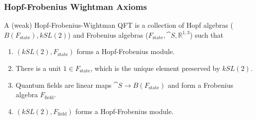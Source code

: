 \documentclass{beamer}
\begin{document}
\begin{frame}
\frametitle{Hopf-Frobenius Wightman Axioms}




A (weak) Hopf-Frobenius-Wightman QFT is a collection of Hopf algebras ($B(F_{\text{state}}), k SL(2)$)  and Frobenius algebras ($F_{\text{state}}, \cat{S}, \mathbb{R}^{1,3}$)  such that

\bigskip

\begin{enumerate}


\item {} $(k SL(2),F_{\text{state}})$ forms a Hopf-Frobenius module.

\item {} There is a unit $1 \in F_{\text{state}}$, which is the unique element preserved by $k SL(2)$.

\item {} Quantum fields are linear maps $\cat{S} \to B(F_{\text{state}})$ and form a Frobenius algebra $F_{\text{field}}$.

\item {} $(k SL(2),F_{\text{field}})$ forms a Hopf-Frobenius module.





\end{enumerate}


\end{frame}

%
%
%
%
%
%
%
%
%
%
%
%
%
%
\end{document}
